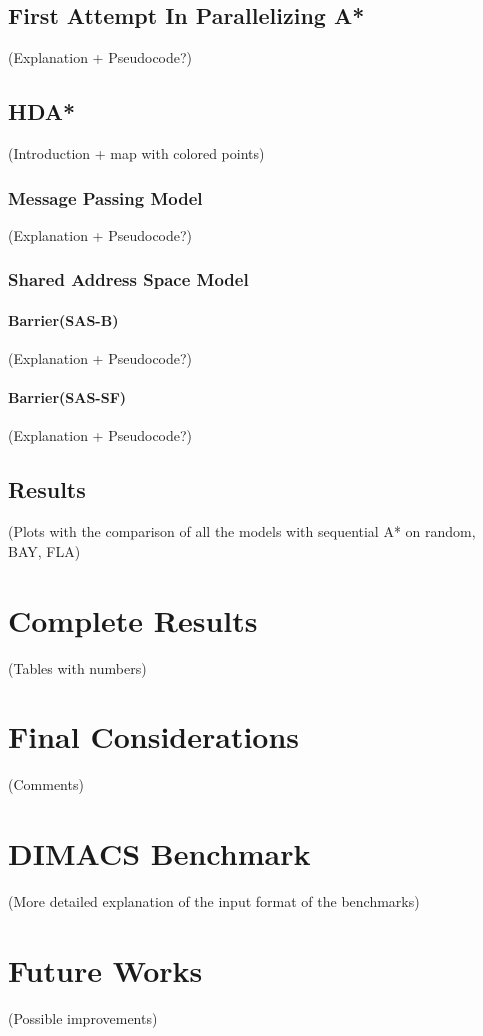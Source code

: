 \documentclass[twocolumn, switch]{article} %
\begin{document}
\subsection{First Attempt In Parallelizing A*}
(Explanation + Pseudocode?)
\subsection{HDA*}
(Introduction + map with colored points)
\subsubsection{Message Passing Model}
(Explanation + Pseudocode?)
\subsubsection{Shared Address Space Model}
\paragraph{Barrier(SAS-B)}
(Explanation + Pseudocode?)
\paragraph{Barrier(SAS-SF)}
(Explanation + Pseudocode?)
\subsection{Results}
(Plots with the comparison of all the models with sequential A* on
random, BAY, FLA)

\section{Complete Results}
(Tables with numbers)

\section{Final Considerations}
(Comments)

\section{DIMACS Benchmark}
(More detailed explanation of the input format of the benchmarks)

\section{Future Works}
(Possible improvements)
\end{document}
